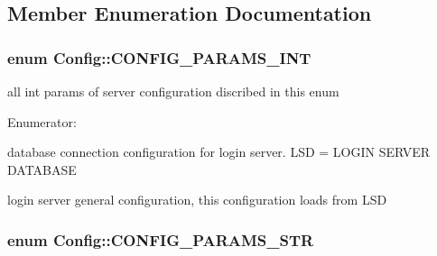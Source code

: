 \subsection{Member Enumeration Documentation}
\hypertarget{classConfig_a0f80a094ada73f8574e85b160a5e47b7}{
\subsubsection[{CONFIG\_\-PARAMS\_\-INT}]{\setlength{\rightskip}{0pt plus 5cm}enum {\bf Config::CONFIG\_\-PARAMS\_\-INT}}}
\label{classConfig_a0f80a094ada73f8574e85b160a5e47b7}


all int params of server configuration discribed in this enum 

\begin{Desc}
\item[Enumerator: ]\par
\begin{description}
\item[{\em 
\hypertarget{classConfig_a0f80a094ada73f8574e85b160a5e47b7a08d4d5bb46c46b471b8af9328d91fa68}{
LSD\_\-PORT}
\label{classConfig_a0f80a094ada73f8574e85b160a5e47b7a08d4d5bb46c46b471b8af9328d91fa68}
}]database connection configuration for login server. LSD = LOGIN SERVER DATABASE \item[{\em 
\hypertarget{classConfig_a0f80a094ada73f8574e85b160a5e47b7a06836aae25f712981143e4e3653521ff}{
LS\_\-DBG\_\-LVL}
\label{classConfig_a0f80a094ada73f8574e85b160a5e47b7a06836aae25f712981143e4e3653521ff}
}]login server general configuration, this configuration loads from LSD \end{description}
\end{Desc}

\hypertarget{classConfig_a6d78e4d65fd44d149ad6facce11bc11e}{
\subsubsection[{CONFIG\_\-PARAMS\_\-STR}]{\setlength{\rightskip}{0pt plus 5cm}enum {\bf Config::CONFIG\_\-PARAMS\_\-STR}}}
\label{classConfig_a6d78e4d65fd44d149ad6facce11bc11e}


